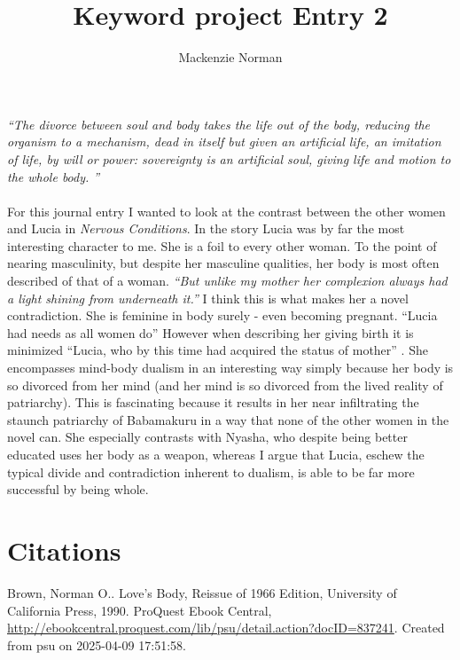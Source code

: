\documentclass{article}
\title{Keyword project Entry 2}
\author{Mackenzie Norman}
\date{}
\begin{document}
\doublespacing 
\maketitle
\textit{``The divorce between soul and body takes the life out of the body, reducing the organism to a mechanism, dead in itself but given an artificial life, an imitation of life, by will or power: sovereignty is an artificial soul, giving life and motion to the whole body. ''}
\paragraph{}

For this journal entry I wanted to look at the contrast between the other women and Lucia in \textit{Nervous Conditions}. In the story Lucia was by far the most interesting character to me. She is a foil to every other woman. To the point of nearing masculinity, but despite her masculine qualities, her body is most often described of that of a woman. \textit{``But unlike my mother her complexion always had a light shining from underneath it.'' } I think this is what makes her a novel contradiction. She is feminine in body surely - even becoming pregnant. ``Lucia had needs as all women do'' However when describing her giving birth it is minimized ``Lucia, who by this time had acquired the status of mother'' .  She encompasses mind-body dualism in an interesting way simply because her body is so divorced from her mind (and her mind is so divorced from the lived reality of patriarchy). This is fascinating because it results in her near infiltrating the staunch patriarchy of Babamakuru in a way that none of the other women in the novel can. She especially contrasts with Nyasha, who despite being better educated uses her body as a weapon, whereas I argue that Lucia, eschew the typical divide and contradiction inherent to dualism, is able to be far more successful by being whole.




\section{Citations}

Brown, Norman O.. Love's Body, Reissue of 1966 Edition, University of California Press, 1990. ProQuest Ebook Central, \url{http://ebookcentral.proquest.com/lib/psu/detail.action?docID=837241}.
Created from psu on 2025-04-09 17:51:58. 
\end{document}
